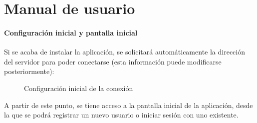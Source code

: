 \chapter{Manual de usuario}
\label{app:appManualUsuario}

\subsubsection{Configuración inicial y pantalla inicial}

Si se acaba de instalar la aplicación, se solicitará automáticamente la dirección del servidor para poder conectarse (esta información puede modificarse posteriormente):

\begin{figure} [!htb]
	\centering
	\caption{Configuración inicial de la conexión}
	\label{fig:confIniCon}
\end{figure}

A partir de este punto, se tiene acceso a la pantalla inicial de la aplicación, desde la que se podrá registrar un nuevo usuario o iniciar sesión con uno existente.

